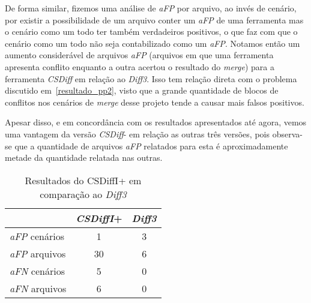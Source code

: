 De forma similar, fizemos uma análise de \emph{aFP} por arquivo, ao invés de
cenário, por existir a possibilidade de um arquivo conter um \emph{aFP} de uma
ferramenta mas o cenário como um todo ter também verdadeiros positivos, o que
faz com que o cenário como um todo não seja contabilizado como um \emph{aFP}.
Notamos então um aumento considerável de arquivos \emph{aFP} (arquivos em que
uma ferramenta apresenta conflito enquanto a outra acertou o resultado do
\emph{merge}) para a ferramenta \emph{CSDiff} em relação ao \emph{Diff3}. Isso
tem relação direta com o problema discutido em~\ref{resultado_pp2}, visto que a
grande quantidade de blocos de conflitos nos cenários de \emph{merge} desse
projeto tende a causar mais falsos positivos.

Apesar disso, e em concordância com os resultados apresentados até agora, vemos
uma vantagem da versão \emph{CSDiff}- em relação as outras três versões, pois
observa-se que a quantidade de arquivos \emph{aFP} relatados para esta é
aproximadamente metade da quantidade relatada nas outras.

\begin{table}[ht]
	\begin{center}
		\begin{tabular}{|l|c|c|}
			\hline
			\textbf{ }          & \textbf{\emph{CSDiffI}+} & \textbf{\emph{Diff3}} \\
			\hline
			\emph{aFP} cenários & 1                 & 3                     \\
			\emph{aFP} arquivos & 30                & 6                     \\
			\emph{aFN} cenários & 5                 & 0                     \\
			\emph{aFN} arquivos & 6                 & 0                     \\
			\hline
		\end{tabular}
	\end{center}
	\caption{Resultados do CSDiffI+ em comparação ao \emph{Diff3}}\label{csdiff_indentation_plus_afp_afn}
\end{table}

